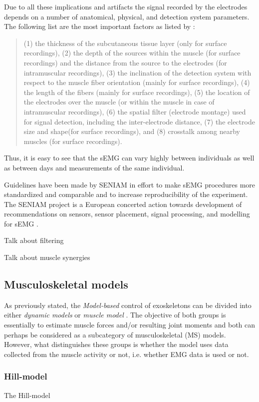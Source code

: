 Due to all these implications and artifacts the signal recorded by the electrodes depends on a number of anatomical, physical, and detection system parameters. The following list are the most important factors as listed by :
\begin{quote}
(1) the thickness of the subcutaneous tissue layer (only for surface recordings),
(2) the depth of the sources within the muscle (for surface recordings) and the distance from the source to the electrodes (for intramuscular recordings),
(3) the inclination of the detection system with respect to the muscle fiber orientation (mainly for surface recordings),
(4) the length of the fibers (mainly for surface recordings),
(5) the location of the electrodes over the muscle (or within the muscle in case of intramuscular recordings),
(6) the spatial filter (electrode montage) used for signal detection, including the inter-electrode distance,
(7) the electrode size and shape(for surface recordings), and
(8) crosstalk among nearby muscles (for surface recordings).
\end{quote}
Thus, it is easy to see that the \ac{sEMG} can vary highly between individuals as well as between days and measurements of the same individual.

Guidelines have been made by \ac{SENIAM} in effort to make \ac{sEMG} procedures more standardized and comparable and to increase reproducibility of the experiment. 
The \ac{SENIAM} project is a European concerted action towards development of recommendations on sensors, sensor placement, signal processing, and modelling for \ac{sEMG} \cite{Hermens2000}.

Talk about filtering

Talk about muscle synergies

\subsection{Musculoskeletal models}
\label{sec:A-MSModels}
As previously stated, the \textit{Model-based} control of exoskeletons can be divided into either \textit{dynamic models} or \textit{muscle model} \cite{Anam2012}. 
The objective of both groups is essentially to estimate muscle forces and/or resulting joint moments and both can perhaps be considered as a subcategory of musculoskeletal (MS) models. 
However, what distinguishes these groups is whether the model uses data collected from the muscle activity or not, i.e. whether \ac{EMG} data is used or not.



\subsubsection{Hill-model}
\label{sec:A-HillModel}
The Hill-model 

